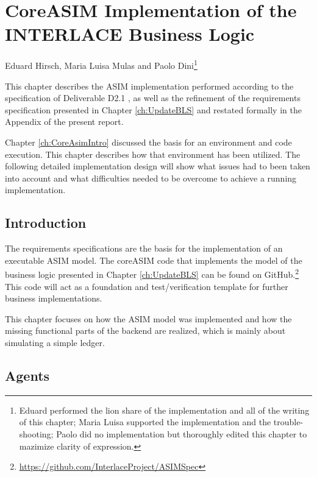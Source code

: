 \chapter{CoreASIM Implementation of the INTERLACE Business Logic}
\label{ch:CoreAsimImplementation}

\vspace{-1cm}
\begin{center}
Eduard Hirsch, Maria Luisa Mulas and Paolo Dini\footnote{Eduard performed the lion share of the implementation and all of the writing of this chapter; Maria Luisa supported the implementation and the trouble-shooting; Paolo did no implementation but thoroughly edited this chapter to mazimize clarity of expression.}
\end{center}

This chapter describes the ASIM implementation performed according to the specification of Deliverable D2.1 \cite{INTERLACE_D21}, as well as the refinement of the requirements specification presented in Chapter \ref{ch:UpdateBLS} and restated formally in the Appendix of the present report.

Chapter \ref{ch:CoreAsimIntro} discussed the basis for an environment and code execution. This chapter describes how that environment has been utilized. The following detailed implementation design will show what issues had to been taken into account and what difficulties needed to be overcome to achieve a running implementation.


\section{Introduction}
\label{sec:impl_intro}

The requirements specifications are the basis for the implementation of an executable ASIM model. The coreASIM code that implements the model of the business logic presented in Chapter \ref{ch:UpdateBLS} can be found on GitHub.\footnote{\url{https://github.com/InterlaceProject/ASIMSpec}} This code will act as a foundation and test/verification template for further business implementations.

This chapter focuses on how the ASIM model was implemented and how the missing functional parts of the backend are realized, which is mainly about simulating a simple ledger.

\section{Agents}
\label{sec:impl-agents}

